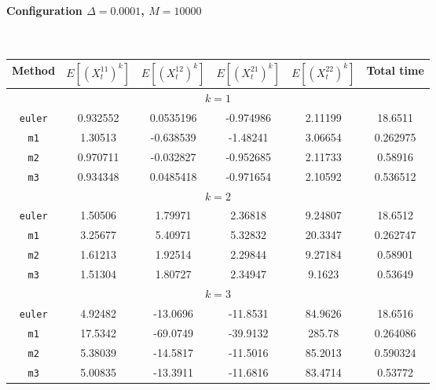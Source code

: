 \paragraph*{Configuration $\Delta=0.0001$, $M=10000$}\hfill\\
\begin{tabular}{@{}*{6}{c}@{}}
Method & $E[(X^{11}_t)^k]$ & $E[(X^{12}_t)^k]$ & $E[(X^{21}_t)^k]$ & $E[(X^{22}_t)^k]$ & Total time\\
\hline
\multicolumn{6}{c}{$k=1$}\\
\verb+euler+ & 0.932552 & 0.0535196 & -0.974986 & 2.11199 & 18.6511 \\
 \verb+m1+ & 1.30513 & -0.638539 & -1.48241 & 3.06654 & 0.262975 \\
 \verb+m2+ & 0.970711 & -0.032827 & -0.952685 & 2.11733 & 0.58916 \\
 \verb+m3+ & 0.934348 & 0.0485418 & -0.971654 & 2.10592 & 0.536512 \\
\hline
\multicolumn{6}{c}{$k=2$}\\
\verb+euler+ & 1.50506 & 1.79971 & 2.36818 & 9.24807 & 18.6512 \\
 \verb+m1+ & 3.25677 & 5.40971 & 5.32832 & 20.3347 & 0.262747 \\
 \verb+m2+ & 1.61213 & 1.92514 & 2.29844 & 9.27184 & 0.58901 \\
 \verb+m3+ & 1.51304 & 1.80727 & 2.34947 & 9.1623 & 0.53649 \\
\hline
\multicolumn{6}{c}{$k=3$}\\
\verb+euler+ & 4.92482 & -13.0696 & -11.8531 & 84.9626 & 18.6516 \\
 \verb+m1+ & 17.5342 & -69.0749 & -39.9132 & 285.78 & 0.264086 \\
 \verb+m2+ & 5.38039 & -14.5817 & -11.5016 & 85.2013 & 0.590324 \\
 \verb+m3+ & 5.00835 & -13.3911 & -11.6816 & 83.4714 & 0.53772 
\end{tabular}\hfill\\

